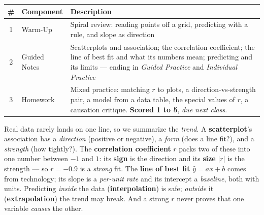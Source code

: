 \documentclass[10pt]{article}
\begin{document}
\begin{tocbox}
\small
\renewcommand{\arraystretch}{1.5}
\begin{tabularx}{\linewidth}{@{} c l X @{}}
\rowcolor{forestbg}
\textbf{\#} & \textbf{Component} & \textbf{Description} \\
\midrule
1 & Warm-Up        & Spiral review: reading points off a grid, predicting with a rule, and
                     slope as direction \\
2 & Guided Notes   & Scatterplots and association; the correlation coefficient; the line of
                     best fit and what its numbers mean; predicting and its limits --- ending in
                     \emph{Guided Practice} and \emph{Individual Practice} \\
3 & Homework       & Mixed practice: matching $r$ to plots, a direction-vs-strength pair, a
                     model from a data table, the special values of $r$, a causation critique.
                     \textbf{Scored 1 to 5}, \emph{due next class}. \\
\end{tabularx}
\end{tocbox}

\vspace{0.10in}

\begin{remindbox}
\small Real data rarely lands on one line, so we summarize the \emph{trend}. A
\textbf{scatterplot}'s association has a \emph{direction} (positive or negative), a \emph{form}
(does a line fit?), and a \emph{strength} (how tightly?). The \textbf{correlation coefficient}
$r$ packs two of these into one number between $-1$ and $1$: its \textbf{sign} is the direction
and its \textbf{size} $|r|$ is the strength --- so $r=-0.9$ is a \emph{strong} fit. The
\textbf{line of best fit} $\hat y=ax+b$ comes from technology; its slope is a \emph{per-unit
rate} and its intercept a \emph{baseline}, both with units. Predicting \emph{inside} the data
(\textbf{interpolation}) is safe; \emph{outside} it (\textbf{extrapolation}) the trend may break.
And a strong $r$ never proves that one variable \emph{causes} the other.
\end{remindbox}
\end{document}
